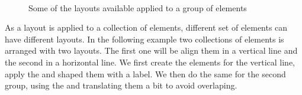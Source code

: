 \documentclass[a4paper,10pt,twoside]{book}
\begin{document}
\begin{figure}[h]
        \centering
		 \hfill
		\hfill
		 \\ 
		 \hfill
		\hfill
        \caption{Some of the layouts available applied to a group of elements}\label{fig:roLayouts}
\end{figure}

As a layout is applied to a collection of elements, different set of elements can have different layouts. In the following example two collections of elements is arranged with two layouts. The first one will be align them in a vertical line and the second in a horizontal line. 
We first create the elements for the vertical line, apply the  and shaped them with a label. We then do the same for the second group, using the  and translating them a bit to avoid overlaping.
\end{document}

